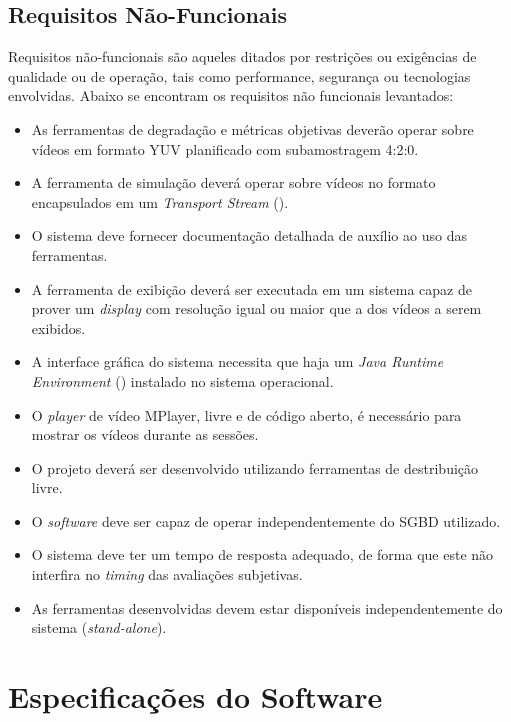 \subsection{Requisitos Não-Funcionais}

Requisitos não-funcionais são aqueles ditados por restrições ou exigências de qualidade ou de operação, tais como performance, segurança ou tecnologias envolvidas.
Abaixo se encontram os requisitos não funcionais levantados:


\begin{itemize}
	\item As ferramentas de degradação e métricas objetivas deverão operar sobre vídeos em formato YUV planificado com subamostragem 4:2:0.
	\item A ferramenta de simulação deverá operar sobre vídeos no formato  encapsulados em um \emph{Transport Stream} ().
	\item O sistema deve fornecer documentação detalhada de auxílio ao uso das ferramentas.
	\item A ferramenta de exibição deverá ser executada em um sistema capaz de prover um \emph{display} com resolução igual ou maior que a dos vídeos a serem exibidos.
	\item A interface gráfica do sistema necessita que haja um \emph{Java Runtime Environment} () instalado no sistema operacional.
	\item O \emph{player} de vídeo MPlayer, livre e de código aberto, é necessário para mostrar os vídeos durante as sessões.
	\item O projeto deverá ser desenvolvido utilizando ferramentas de destribuição livre.
	\item O \emph{software} deve ser capaz de operar independentemente do SGBD utilizado.
	\item O sistema deve ter um tempo de resposta adequado, de forma que este não interfira no \emph{timing} das avaliações subjetivas.
	\item As ferramentas desenvolvidas devem estar disponíveis independentemente do sistema (\emph{stand-alone}).
\end{itemize}

\section{Especificações do Software}

